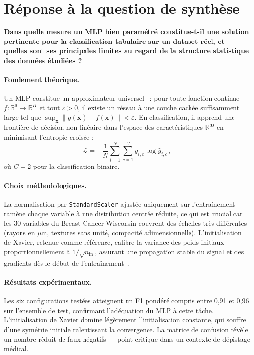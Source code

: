 \section{Réponse à la question de synthèse}
\textbf{Dans quelle mesure un MLP bien paramétré constitue-t-il une solution pertinente pour la classification tabulaire sur un dataset réel, et quelles sont ses principales limites au regard de la structure statistique des données étudiées ?}

\paragraph{Fondement théorique.}
Un MLP constitue un approximateur universel~\citep{goodfellow2016deep} : pour toute
fonction continue $f : \mathbb{R}^d \to \mathbb{R}^K$ et tout $\varepsilon > 0$,
il existe un réseau à une couche cachée suffisamment large tel que
$\sup_{\mathbf{x}} \|g(\mathbf{x}) - f(\mathbf{x})\| < \varepsilon$.
En classification, il apprend une frontière de décision non linéaire dans l'espace
des caractéristiques $\mathbb{R}^{30}$ en minimisant l'entropie croisée :
\[
    \mathcal{L} = -\frac{1}{N}\sum_{i=1}^{N}\sum_{c=1}^{C}
    y_{i,c}\,\log\hat{y}_{i,c}\,,
\]
où $C = 2$ pour la classification binaire.

\paragraph{Choix méthodologiques.}
La normalisation par \texttt{StandardScaler} ajustée uniquement sur l'entraînement
ramène chaque variable à une distribution centrée réduite, ce qui est crucial car
les 30 variables du Breast Cancer Wisconsin couvrent des échelles très différentes
(rayons en $\mu$m, textures sans unité, compacité adimensionnelle). L'initialisation
de Xavier, retenue comme référence, calibre la variance des poids initiaux
proportionnellement à $1/\sqrt{n_{\text{in}}}$, assurant une propagation stable du
signal et des gradients dès le début de l'entraînement~\citep{glorot2010understanding}.

\paragraph{Résultats expérimentaux.}
Les six configurations testées atteignent un F1 pondéré compris entre 0,91 et 0,96
sur l'ensemble de test, confirmant l'adéquation du MLP à cette tâche.
L'initialisation de Xavier domine légèrement l'initialisation constante, qui souffre
d'une symétrie initiale ralentissant la convergence. La matrice de confusion révèle
un nombre réduit de faux négatifs --- point critique dans un contexte de dépistage
médical.


